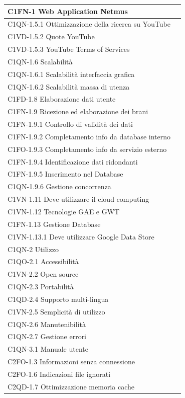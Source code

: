 \begin{footnotesize}
\begin{longtable}[!h]{|l|l|}
C1FN-1 Web Application Netmus \\ \hline
C1QN-1.5.1 Ottimizzazione della ricerca su YouTube \\ \hline
C1VD-1.5.2 Quote YouTube \\ \hline
C1VD-1.5.3 YouTube Terms of Services \\ \hline
C1QN-1.6 Scalabilit\`a \\ \hline
C1QN-1.6.1 Scalabilit\`a interfaccia grafica \\ \hline
C1QN-1.6.2 Scalabilit\`a massa di utenza \\ \hline
C1FD-1.8 Elaborazione dati utente \\ \hline
C1FN-1.9 Ricezione ed elaborazione dei brani \\ \hline
C1FN-1.9.1 Controllo di validit\`a dei dati \\ \hline
C1FN-1.9.2 Completamento info da database interno \\ \hline
C1FO-1.9.3 Completamento info da servizio esterno \\ \hline
C1FN-1.9.4 Identificazione dati ridondanti \\ \hline
C1FN-1.9.5 Inserimento nel Database \\ \hline
C1QN-1.9.6 Gestione concorrenza \\ \hline
C1VN-1.11 Deve utilizzare il cloud computing \\ \hline
C1VN-1.12 Tecnologie GAE e GWT \\ \hline
C1FN-1.13 Gestione Database \\ \hline
C1VN-1.13.1 Deve utilizzare Google Data Store \\ \hline
C1QN-2 Utilizzo \\ \hline
C1QO-2.1 Accessibilit\`a \\ \hline
C1VN-2.2 Open source \\ \hline
C1QN-2.3 Portabilit\`a \\ \hline
C1QD-2.4 Supporto multi-lingua \\ \hline
C1VN-2.5 Semplicit\`a di utilizzo \\ \hline
C1QN-2.6 Manutenibilit\`a \\ \hline
C1QN-2.7 Gestione errori \\ \hline
C1QN-3.1 Manuale utente \\ \hline
C2FO-1.3 Informazioni senza connessione \\ \hline
C2FO-1.6 Indicazioni file ignorati \\ \hline
C2QD-1.7 Ottimizzazione memoria cache \\ \hline 

\end{longtable}
\end{footnotesize}
